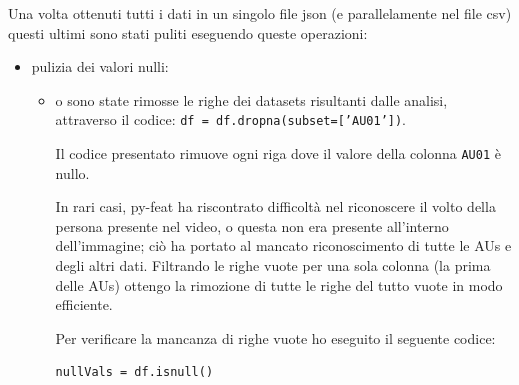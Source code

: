 Una volta ottenuti tutti i dati in un singolo file json (e parallelamente nel file csv) questi ultimi sono stati puliti eseguendo queste operazioni:
\begin{itemize}
    \item pulizia dei valori nulli:
    \begin{itemize}
        \item o	sono state rimosse le righe dei datasets risultanti dalle analisi, attraverso il codice: \texttt{df = df.dropna(subset=['AU01'])}.
        
        Il codice presentato rimuove ogni riga dove il valore della colonna \texttt{AU01} è nullo.
        
        In rari casi, py-feat ha riscontrato difficoltà nel riconoscere il volto della persona presente nel video, o questa non era presente all’interno dell’immagine; ciò ha portato al mancato riconoscimento di tutte le AUs e degli altri dati. Filtrando le righe vuote per una sola colonna (la prima delle AUs) ottengo la rimozione di tutte le righe del tutto vuote in modo efficiente. 
        
        Per verificare la mancanza di righe vuote ho eseguito il seguente codice:
        \begin{verbatim}
nullVals = df.isnull()


\end{verbatim}
\end{itemize}
\end{itemize}
